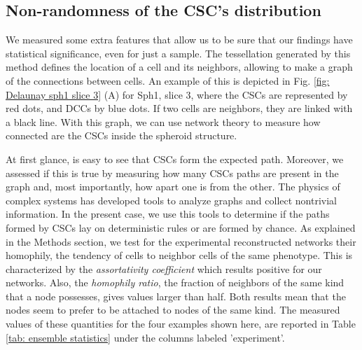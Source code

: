 \documentclass[fleqn,10pt]{wlscirep}
\begin{document}
\subsection*{Non-randomness of the CSC's distribution}

We measured some extra features that allow us to be sure that our findings have statistical significance, even for just a sample. The tessellation generated by this method defines the location of a cell and its neighbors, allowing to make a graph of the connections between cells. An example of this is depicted in Fig. \ref{fig: Delaunay sph1 slice 3} (A) for {\textsf Sph1, slice 3}, where the CSCs are represented by red dots, and DCCs by blue dots. If two cells are neighbors, they are linked with a black line. With this graph, we can use network theory to measure how connected are the CSCs inside the spheroid structure. 

At first glance, is easy to see that CSCs form the expected path. Moreover, we assessed if this is true by measuring how many CSCs paths are present in the graph and, most importantly, how apart one is from the other. The physics of complex systems has developed tools to analyze graphs and collect nontrivial information. In the present case, we use this tools to determine if the paths formed by CSCs lay on  deterministic rules or are formed by chance. As explained in the Methods section,  we test for the experimental reconstructed networks their homophily, the tendency of cells to neighbor cells of the same phenotype. This is characterized by the \emph{assortativity coefficient} which results positive for our networks. Also, the \emph{homophily ratio}, the fraction of neighbors of the same kind that a node possesses, gives values larger than half. Both results mean that the nodes seem to prefer to be attached to nodes of the same kind. The measured values of these quantities for the four examples shown here, are reported in Table \ref{tab: ensemble statistics} under the columns labeled 'experiment'.   
\end{document}
